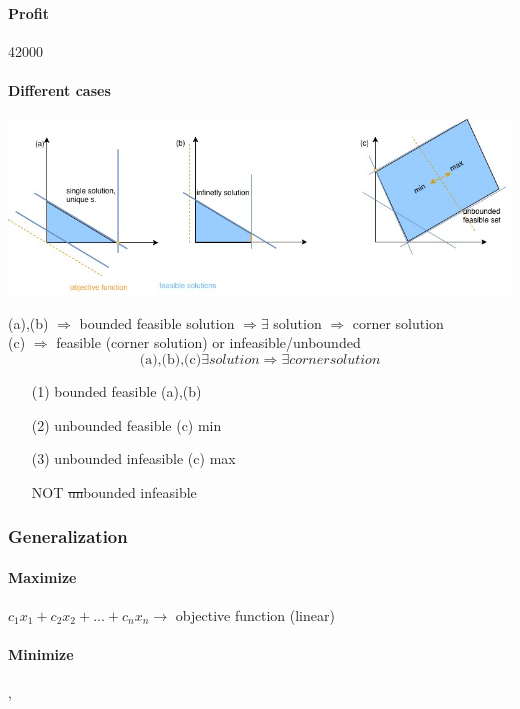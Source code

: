 \paragraph{Profit} 42000 \EUR
\paragraph{Different cases}
\begin{center}
	\includegraphics[scale=0.5]{img/dia3}
\end{center}
(a),(b) $\Rightarrow$ bounded feasible solution $\Rightarrow \exists$ solution $\Rightarrow$ corner solution \\
(c) $\Rightarrow$ feasible (corner solution) or infeasible/unbounded
$$\text{(a),(b),(c)} \exists solution \Rightarrow \exists corner solution$$
\begin{itemize}
	\item[(1)] bounded feasible (a),(b)
	\item[(2)] unbounded feasible (c) min
	\item[(3)] unbounded infeasible (c) max
	\item[NOT] \sout{un}bounded infeasible
\end{itemize}

\subsubsection{Generalization}
\paragraph{Maximize} $c_1x_1 + c_2x_2 + ... + c_nx_n \rightarrow$ objective function (linear)
\paragraph{Minimize} \phantom, 
